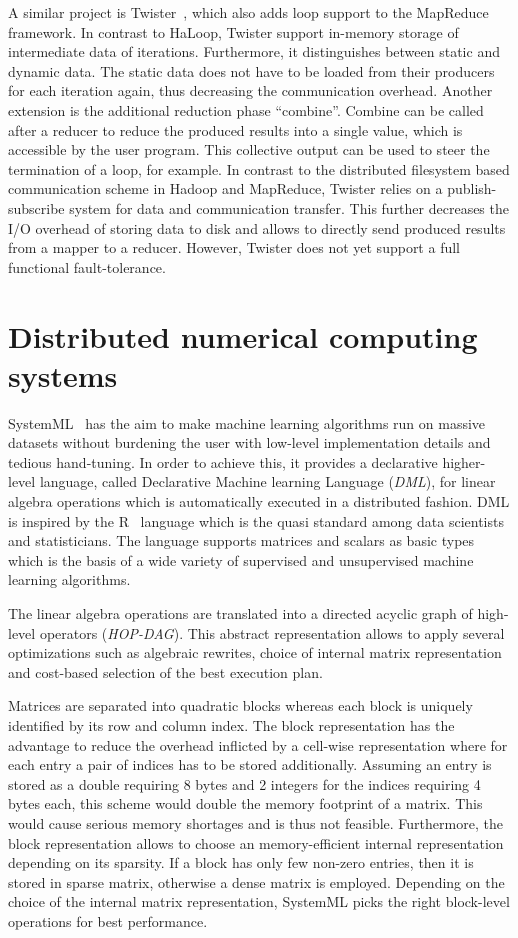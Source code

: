 A similar project is Twister~\cite{ekanayake:2010a}, which also adds loop support to the MapReduce framework.
In contrast to HaLoop, Twister support in-memory storage of intermediate data of iterations.
Furthermore, it distinguishes between static and dynamic data.
The static data does not have to be loaded from their producers for each iteration again, thus decreasing the communication overhead.
Another extension is the additional reduction phase ``combine''.
Combine can be called after a reducer to reduce the produced results into a single value, which is accessible by the user program.
This collective output can be used to steer the termination of a loop, for example.
In contrast to the distributed filesystem based communication scheme in Hadoop and MapReduce, Twister relies on a publish-subscribe system for data and communication transfer.
This further decreases the I/O overhead of storing data to disk and allows to directly send produced results from a mapper to a reducer.
However, Twister does not yet support a full functional fault-tolerance.

\section{Distributed numerical computing systems}

SystemML~\cite{ghoting:2011a} has the aim to make machine learning algorithms run on massive datasets without burdening the user with low-level implementation details and tedious hand-tuning.
In order to achieve this, it provides a declarative higher-level language, called Declarative Machine learning Language (\emph{DML}), for linear algebra operations which is automatically executed in a distributed fashion.
DML is inspired by the R~\cite{r:1993a} language which is the quasi standard among data scientists and statisticians.
The language supports matrices and scalars as basic types which is the basis of a wide variety of supervised and unsupervised machine learning algorithms.

The linear algebra operations are translated into a directed acyclic graph of high-level operators (\emph{HOP-DAG}).
This abstract representation allows to apply several optimizations such as algebraic rewrites, choice of internal matrix representation and cost-based selection of the best execution plan.

Matrices are separated into quadratic blocks whereas each block is uniquely identified by its row and column index.
The block representation has the advantage to reduce the overhead inflicted by a cell-wise representation where for each entry a pair of indices has to be stored additionally.
Assuming an entry is stored as a double requiring 8 bytes and 2 integers for the indices requiring 4 bytes each, this scheme would double the memory footprint of a matrix.
This would cause serious memory shortages and is thus not feasible.
Furthermore, the block representation allows to choose an memory-efficient internal representation depending on its sparsity.
If a block has only few non-zero entries, then it is stored in sparse matrix, otherwise a dense matrix is employed.
Depending on the choice of the internal matrix representation, SystemML picks the right block-level operations for best performance.

